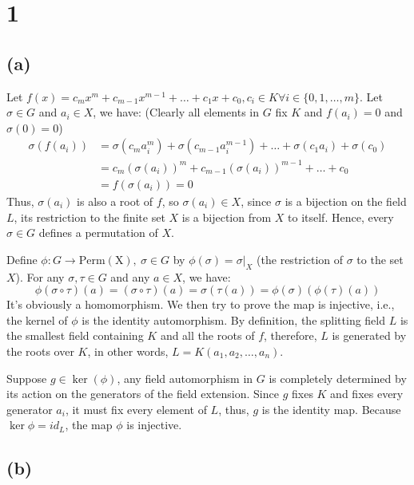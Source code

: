 \documentclass{article}
\title{\mytitle}
\author{\textbf{\myauthor}}
\date{}
\theoremstyle{definition}
\theoremstyle{remark}
\begin{document}
\maketitle

\setcounter{section}{1}
\section*{1}
\subsection*{(a)}
Let $f(x)=c_mx^m+c_{m-1}x^{m-1}+\dots+c_1x+c_0, c_i\in K\forall i\in\{0,1,\dots,m\}$. Let $\sigma\in G$ and $a_i\in X$, we have: (Clearly all elements in $G$ fix $K$ and $f(a_i)=0$ and $\sigma(0)=0$)
\begin{align*}
\sigma(f(a_i))&=\sigma(c_ma_i^m)+\sigma(c_{m-1}a_i^{m-1})+\dots+\sigma(c_1a_i)+\sigma(c_0) \\
&=c_m(\sigma(a_i))^m+c_{m-1}(\sigma(a_i))^{m-1}+\dots+c_0 \\
&=f(\sigma(a_i))=0
\end{align*}
Thus, $\sigma(a_i)$ is also a root of $f$, so $\sigma(a_i)\in X$, since $\sigma$ is a bijection on the field $L$, its restriction to the finite set $X$ is a bijection from $X$ to itself. Hence, every $\sigma \in G$ defines a permutation of $X$.

Define $\phi:G\rightarrow \mathrm{Perm(X)},\ \sigma\in G$ by $\phi(\sigma)=\sigma|_{X}$ (the restriction of $\sigma$ to the set $X$). For any $\sigma, \tau\in G$ and any $a\in X$, we have:
\[\phi(\sigma\circ\tau)(a)=(\sigma\circ\tau)(a)=\sigma(\tau(a))=\phi(\sigma)(\phi(\tau)(a))\]
It's obviously a homomorphism. We then try to prove the map is injective, i.e., the kernel of $\phi$ is the identity automorphism. By definition, the splitting field $L$ is the smallest field containing $K$ and all the roots of $f$, therefore, $L$ is generated by the roots over $K$, in other words, $L=K(a_1,a_2,\dots,a_n)$.

Suppose $g\in \ker{(\phi)}$, any field automorphism in $G$ is completely determined by its action on the generators of the field extension. Since $g$ fixes $K$ and fixes every generator $a_i$, it must fix every element of $L$, thus, $g$ is the identity map. Because $\ker{\phi}={id_L}$, the map $\phi$ is injective.
\subsection*{(b)}
\end{document}
